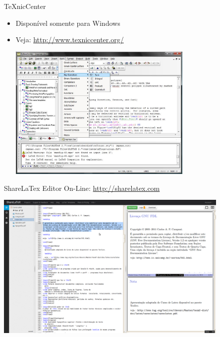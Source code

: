 \begin{frame}{\TeX{}nicCenter}
\begin{itemize}
\item Disponível somente para Windows
\item Veja: \url{http://www.texniccenter.org/}

\vspace{0.5cm}

\centering\includegraphics[width=0.70\textwidth]{img/texniccenter.pdf}
\end{itemize}
\end{frame}

\begin{frame}{ShareLaTex}
Editor On-Line: \url{http://sharelatex.com}
\begin{center}
\includegraphics[width=0.85\textwidth]{img/sharelatex.png}
\end{center}
\end{frame}

